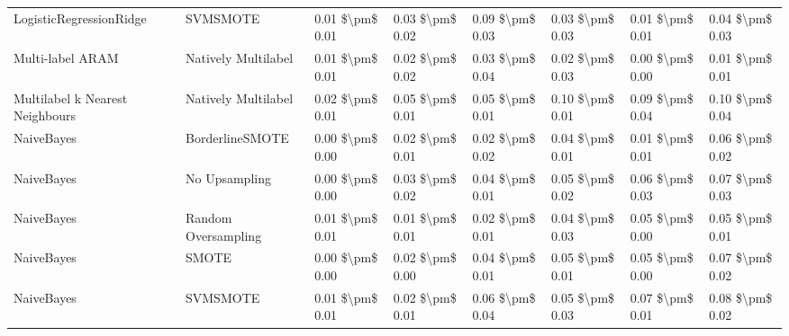 \begin{tabular}{llllllll}
        LogisticRegressionRidge &                      SVMSMOTE & 0.01 \$\textbackslash pm\$ 0.01 &           0.03 \$\textbackslash pm\$ 0.02 &       0.09 \$\textbackslash pm\$ 0.03 &        0.03 \$\textbackslash pm\$ 0.03 &                         0.01 \$\textbackslash pm\$ 0.01 &     0.04 \$\textbackslash pm\$ 0.03 \\
               Multi-label ARAM &           Natively Multilabel & 0.01 \$\textbackslash pm\$ 0.01 &           0.02 \$\textbackslash pm\$ 0.02 &       0.03 \$\textbackslash pm\$ 0.04 &        0.02 \$\textbackslash pm\$ 0.03 &                         0.00 \$\textbackslash pm\$ 0.00 &     0.01 \$\textbackslash pm\$ 0.01 \\
Multilabel k Nearest Neighbours &           Natively Multilabel & 0.02 \$\textbackslash pm\$ 0.01 &           0.05 \$\textbackslash pm\$ 0.01 &       0.05 \$\textbackslash pm\$ 0.01 &        0.10 \$\textbackslash pm\$ 0.01 &                         0.09 \$\textbackslash pm\$ 0.04 &     0.10 \$\textbackslash pm\$ 0.04 \\
                     NaiveBayes &               BorderlineSMOTE & 0.00 \$\textbackslash pm\$ 0.00 &           0.02 \$\textbackslash pm\$ 0.01 &       0.02 \$\textbackslash pm\$ 0.02 &        0.04 \$\textbackslash pm\$ 0.01 &                         0.01 \$\textbackslash pm\$ 0.01 &     0.06 \$\textbackslash pm\$ 0.02 \\
                     NaiveBayes &                 No Upsampling & 0.00 \$\textbackslash pm\$ 0.00 &           0.03 \$\textbackslash pm\$ 0.02 &       0.04 \$\textbackslash pm\$ 0.01 &        0.05 \$\textbackslash pm\$ 0.02 &                         0.06 \$\textbackslash pm\$ 0.03 &     0.07 \$\textbackslash pm\$ 0.03 \\
                     NaiveBayes &           Random Oversampling & 0.01 \$\textbackslash pm\$ 0.01 &           0.01 \$\textbackslash pm\$ 0.01 &       0.02 \$\textbackslash pm\$ 0.01 &        0.04 \$\textbackslash pm\$ 0.03 &                         0.05 \$\textbackslash pm\$ 0.00 &     0.05 \$\textbackslash pm\$ 0.01 \\
                     NaiveBayes &                         SMOTE & 0.00 \$\textbackslash pm\$ 0.00 &           0.02 \$\textbackslash pm\$ 0.00 &       0.04 \$\textbackslash pm\$ 0.01 &        0.05 \$\textbackslash pm\$ 0.01 &                         0.05 \$\textbackslash pm\$ 0.00 &     0.07 \$\textbackslash pm\$ 0.02 \\
                     NaiveBayes &                      SVMSMOTE & 0.01 \$\textbackslash pm\$ 0.01 &           0.02 \$\textbackslash pm\$ 0.01 &       0.06 \$\textbackslash pm\$ 0.04 &        0.05 \$\textbackslash pm\$ 0.03 &                         0.07 \$\textbackslash pm\$ 0.01 &     0.08 \$\textbackslash pm\$ 0.02 \\

\end{tabular}

